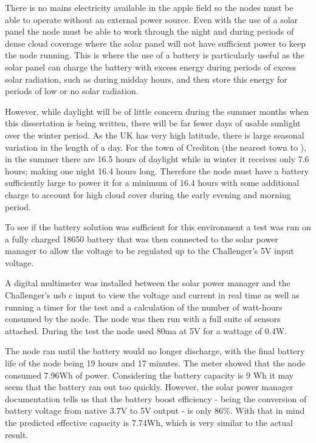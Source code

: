 There is no mains electricity available in the apple field so the nodes must be
able to operate without an external power source. Even with the use of a solar
panel the node must be able to work through the night and during periods of
dense cloud coverage where the solar panel will not have sufficient power to
keep the node running. This is where the use of a battery is particularly useful
as the solar panel can charge the battery with excess energy during periods of
excess solar radiation, such as during midday hours, and then store this energy
for periods of low or no solar radiation.

However, while daylight will be of little concern during the summer months when
this dissertation is being written, there will be far fewer days of usable
sunlight over the winter period. As the UK has very high latitude, there is
large seasonal variation in the length of a day. For the town of Crediton (the
nearest town to \farmName), in the summer there are 16.5 hours of daylight while
in winter it receives only 7.6 hours; making one night 16.4 hours long.
Therefore the node must have a battery sufficiently large to power it for a
minimum of 16.4 hours with some additional charge to account for high cloud
cover during the early evening and morning period.

To see if the battery solution was sufficient for this environment a test was
run on a fully charged 18650 battery that was then connected to the solar power
manager to allow the voltage to be regulated up to the Challenger's 5V input
voltage.

A digital multimeter was installed between the solar power manager and the
Challenger's usb c input to view the voltage and current in real time as well as
running a timer for the test and a calculation of the number of watt-hours
consumed by the node. The node was then run with a full suite of sensors
attached. During the test the node used 80ma at 5V for a wattage of 0.4W.

The node ran until the battery would no longer discharge, with the final battery
life of the node being 19 hours and 17 minutes. The meter showed that the node
consumed 7.96Wh of power. Considering the battery capacity is 9 Wh it may seem
that the battery ran out too quickly. However, the solar power manager
documentation tells us that the battery boost efficiency - being the conversion
of battery voltage from native 3.7V to 5V output - is only 86\%. With that in
mind the predicted effective capacity is 7.74Wh, which is very similar to the
actual result.

